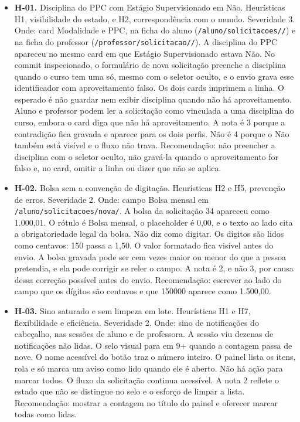 \begin{itemize}
    \item \textbf{H-01.} Disciplina do PPC com Estágio Supervisionado em Não. Heurísticas H1, visibilidade do estado, e H2, correspondência com o mundo. Severidade 3. Onde: card Modalidade e PPC, na ficha do aluno (\texttt{/aluno/\allowbreak solicitacoes//}) e na ficha do professor (\texttt{/professor/\allowbreak solicitacao//}). A disciplina do PPC apareceu no mesmo card em que Estágio Supervisionado estava Não. No commit inspecionado, o formulário de nova solicitação preenche a disciplina quando o curso tem uma só, mesmo com o seletor oculto, e o envio grava esse identificador com aproveitamento falso. Os dois cards imprimem a linha. O esperado é não guardar nem exibir disciplina quando não há aproveitamento. Aluno e professor podem ler a solicitação como vinculada a uma disciplina do curso, embora o card diga que não há aproveitamento. A nota é 3 porque a contradição fica gravada e aparece para os dois perfis. Não é 4 porque o Não também está visível e o fluxo não trava. Recomendação: não preencher a disciplina com o seletor oculto, não gravá-la quando o aproveitamento for falso e, no card, omitir a linha ou dizer que não se aplica.
    \item \textbf{H-02.} Bolsa sem a convenção de digitação. Heurísticas H2 e H5, prevenção de erros. Severidade 2. Onde: campo Bolsa mensal em \texttt{/aluno/\allowbreak solicitacoes/\allowbreak nova/}. A bolsa da solicitação 34 apareceu como 1.000,01. O rótulo é Bolsa mensal, o placeholder é 0,00, e o texto ao lado cita a obrigatoriedade legal da bolsa. Não diz como digitar. Os dígitos são lidos como centavos: 150 passa a 1,50. O valor formatado fica visível antes do envio. A bolsa gravada pode ser cem vezes maior ou menor do que a pessoa pretendia, e ela pode corrigir se reler o campo. A nota é 2, e não 3, por causa dessa correção possível antes do envio. Recomendação: escrever ao lado do campo que os dígitos são centavos e que 150000 aparece como 1.500,00.
    \item \textbf{H-03.} Sino saturado e sem limpeza em lote. Heurísticas H1 e H7, flexibilidade e eficiência. Severidade 2. Onde: sino de notificações do cabeçalho, nas sessões de aluno e de professora. A sessão viu dezenas de notificações não lidas. O selo visual para em 9+ quando a contagem passa de nove. O nome acessível do botão traz o número inteiro. O painel lista os itens, rola e só marca um aviso como lido quando ele é aberto. Não há ação para marcar todos. O fluxo da solicitação continua acessível. A nota 2 reflete o estado que não se distingue no selo e o esforço de limpar a lista. Recomendação: mostrar a contagem no título do painel e oferecer marcar todas como lidas.

\end{itemize}
